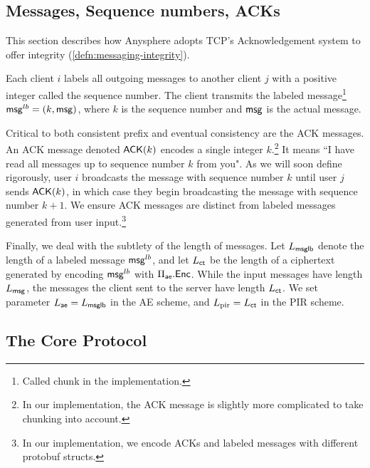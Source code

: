 \subsection{Messages, Sequence numbers, ACKs}
\label{subsec:ACK}
This section describes how Anysphere adopts TCP's Acknowledgement system to offer integrity (\cref{defn:messaging-integrity}).

Each client $i$ labels all outgoing messages to another client $j$ with a positive integer called the sequence number. The client transmits the labeled message\footnote{Called chunk in the implementation.} $\mathsf{msg}^{lb} = (k, \mathsf{msg})$, where $k$ is the sequence number and $\mathsf{msg}$ is the actual message. 

Critical to both consistent prefix and eventual consistency are the ACK messages. An ACK message denoted $\mathsf{ACK}(k)$ encodes a single integer $k$.\footnote{In our implementation, the ACK message is slightly more complicated to take chunking into account.} It means ``I have read all messages up to sequence number $k$ from you". As we will soon define rigorously, user $i$ broadcasts the message with sequence number $k$ until user $j$ sends $\mathsf{ACK}(k)$, in which case they begin broadcasting the message with sequence number $k + 1$. We ensure ACK messages are distinct from labeled messages generated from user input.\footnote{In our implementation, we encode ACKs and labeled messages with different protobuf structs.}

Finally, we deal with the subtlety of the length of messages. Let $L_{\mathsf{msglb}}$ denote the length of a labeled message $\mathsf{msg}^{lb}$, and let $L_{\mathsf{ct}}$ be the length of a ciphertext generated by encoding $\mathsf{msg}^{lb}$ with $\Pi_{\mathsf{ae}}.\mathsf{Enc}$. While the input messages have length $L_{\mathsf{msg}}$, the messages the client sent to the server have length $L_{\mathsf{ct}}$. We set parameter $L_{\mathsf{ae}} = L_{\mathsf{msglb}}$ in the AE scheme, and $L_{\text{pir}} = L_{\mathsf{ct}}$ in the PIR scheme.

\subsection{The Core Protocol}
\label{subsec:core-protocol}

